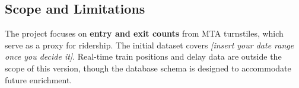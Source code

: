 \subsection{Scope and Limitations}

The project focuses on \textbf{entry and exit counts} from MTA turnstiles, which serve
as a proxy for ridership. The initial dataset covers
\textit{[insert your date range once you decide it]}.
Real-time train positions and delay data are outside the scope of this version,
though the database schema is designed to accommodate future enrichment.
